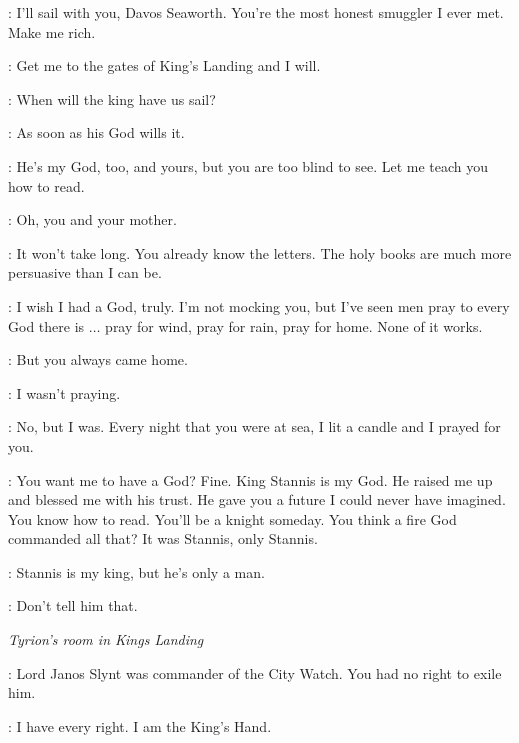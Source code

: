 
\SALLADHOR: I'll sail with you, Davos Seaworth. You're the most honest smuggler I ever met. Make me rich.

\DAVOS: Get me to the gates of King's Landing and I will.


\MATTHOS: When will the king have us sail?

\DAVOS: As soon as his God wills it.

\MATTHOS: He's my God, too, and yours, but you are too blind to see. Let me teach you how to read.

\DAVOS: Oh, you and your mother.

\MATTHOS: It won't take long. You already know the letters. The holy books are much more persuasive than I can be.

\DAVOS: I wish I had a God, truly. I'm not mocking you, but I've seen men pray to every God there is $\ldots$ pray for wind, pray for rain, pray for home. None of it works.

\MATTHOS: But you always came home.

\DAVOS: I wasn't praying.

\MATTHOS: No, but I was. Every night that you were at sea, I lit a candle and I prayed for you.

\DAVOS: You want me to have a God? Fine. King Stannis is my God. He raised me up and blessed me with his trust. He gave you a future I could never have imagined. You know how to read. You'll be a knight someday. You think a fire God commanded all that? It was Stannis, only Stannis.

\MATTHOS: Stannis is my king, but he's only a man.

\DAVOS: Don't tell him that.



\scene

\textit{Tyrion's room in Kings Landing}


\CERSEI: Lord Janos Slynt was commander of the City Watch. You had no right to exile him.

\TYRION: I have every right. I am the King's Hand.

